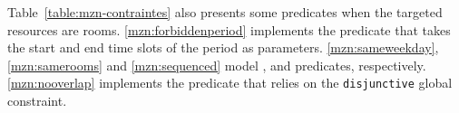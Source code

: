 


%
Table~\ref{table:mzn-contraintes} also presents some \UTP{} predicates when the targeted resources are rooms.
\ref{mzn:forbiddenperiod} implements the \texttt{\FORBIDDENPERIOD} predicate that takes the start and end time slots of the period as parameters.
\ref{mzn:sameweekday}, \ref{mzn:samerooms} and \ref{mzn:sequenced} model \texttt{\SAMEWEEKDAY}, \texttt{\SAMEROOMS} and \texttt{\SEQUENCED} predicates, respectively.
\ref{mzn:nooverlap} implements the \texttt{\NOOVERLAP} predicate that relies on the \texttt{disjunctive} global constraint.

